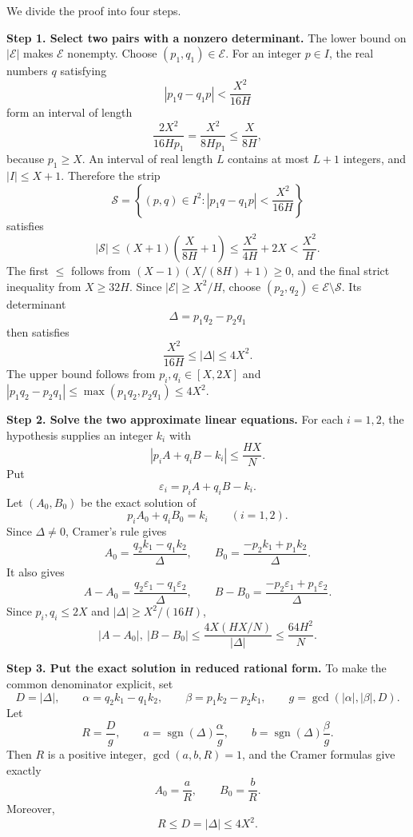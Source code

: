 \documentclass[twoside]{aomart}
\makeatletter
\theoremstyle{paperplain}
\theoremstyle{paperdefinition}
\renewenvironment{proof}[1][\proofname]{\par\pushQED{\qed}%
  \normalfont\topsep6\p@\@plus3\p@\relax\trivlist
  \item[\hskip\labelsep\itshape #1\@addpunct{.}]\ignorespaces
}{\popQED\endtrivlist\@endpefalse}
\numberwithin{equation}{section}
\makeatother
\begin{document}
\begin{proof}
We divide the proof into four steps.

\medskip
\noindent\textbf{Step 1. Select two pairs with a nonzero determinant.}
The lower bound on $|\mathcal E|$ makes $\mathcal E$ nonempty.
Choose $(p_1,q_1)\in\mathcal E$.  For an integer $p\in I$, the real numbers $q$ satisfying
\[
 |p_1q-q_1p|<\frac{X^2}{16H}
\]
form an interval of length
\[
 \frac{2X^2}{16Hp_1}=\frac{X^2}{8Hp_1}
 \le\frac{X}{8H},
\]
because $p_1\ge X$.  An interval of real length $L$ contains at most
$L+1$ integers, and $|I|\le X+1$.  Therefore the strip
\[
 \mathcal S=\left\{(p,q)\in I^2:
 |p_1q-q_1p|<\frac{X^2}{16H}\right\}
\]
satisfies
\begin{equation*}
 |\mathcal S|
 \le (X+1)\left(\frac X{8H}+1\right)
 \le\frac{X^2}{4H}+2X
 <\frac{X^2}{H}.
\end{equation*}
The first $\le$ follows from
$(X-1)(X/(8H)+1)\ge0$, and the final strict inequality from $X\ge32H$.
Since $|\mathcal E|\ge X^2/H$, choose
$(p_2,q_2)\in\mathcal E\setminus\mathcal S$.  Its determinant
\[
 \Delta=p_1q_2-p_2q_1
\]
then satisfies
\[
 \frac{X^2}{16H}\le|\Delta|\le4X^2.
\]
The upper bound follows from $p_i,q_i\in[X,2X]$ and
$|p_1q_2-p_2q_1|\le\max(p_1q_2,p_2q_1)\le4X^2$.

\medskip
\noindent\textbf{Step 2. Solve the two approximate linear equations.}
For each $i=1,2$, the hypothesis supplies an integer $k_i$ with
\[
 |p_iA+q_iB-k_i|\le\frac{HX}{N}.
\]
Put
\[
 \varepsilon_i=p_iA+q_iB-k_i.
\]
Let $(A_0,B_0)$ be the exact solution of
\[
 p_iA_0+q_iB_0=k_i\qquad(i=1,2).
\]
Since $\Delta\ne0$, Cramer's rule gives
\[
 A_0=\frac{q_2k_1-q_1k_2}{\Delta},
 \qquad
 B_0=\frac{-p_2k_1+p_1k_2}{\Delta}.
\]
It also gives
\[
 A-A_0=\frac{q_2\varepsilon_1-q_1\varepsilon_2}{\Delta},
 \qquad
 B-B_0=\frac{-p_2\varepsilon_1+p_1\varepsilon_2}{\Delta}.
\]
Since $p_i,q_i\le2X$ and $|\Delta|\ge X^2/(16H)$,
\begin{equation}
 |A-A_0|,\ |B-B_0|
 \le\frac{4X(HX/N)}{|\Delta|}
 \le\frac{64H^2}{N}.
 \label{sc:dense-linear-phase-initial-errors}
\end{equation}

\medskip
\noindent\textbf{Step 3. Put the exact solution in reduced rational form.}
To make the common denominator explicit, set
\[
 D=|\Delta|,\qquad
 \alpha=q_2k_1-q_1k_2,\qquad
 \beta=p_1k_2-p_2k_1,
 \qquad
 g=\gcd(|\alpha|,|\beta|,D).
\]
Let
\[
 R=\frac Dg,\qquad
 a=\operatorname{sgn}(\Delta)\frac{\alpha}{g},\qquad
 b=\operatorname{sgn}(\Delta)\frac{\beta}{g}.
\]
Then $R$ is a positive integer, $\gcd(a,b,R)=1$, and the Cramer formulas
give exactly
\[
 A_0=\frac aR,\qquad B_0=\frac bR.
\]
Moreover,
\[
 R\le D=|\Delta|\le4X^2.
\]


\end{proof}
\end{document}
